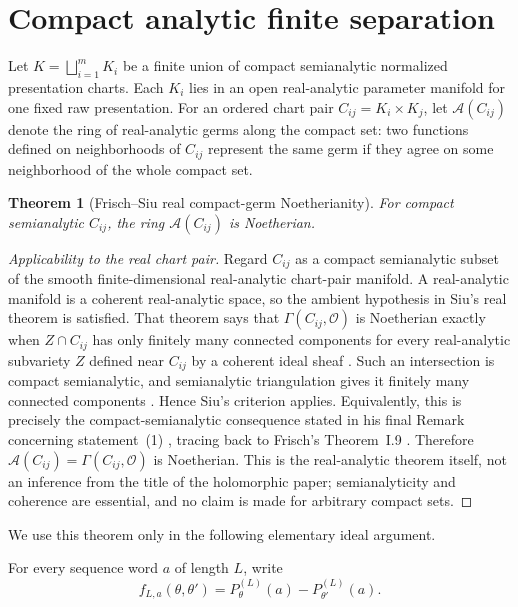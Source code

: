 \documentclass[11pt]{article}
\newtheorem{theorem}{Theorem}[section]
\newcommand{\cA}{\mathcal A}
\begin{document}
\section{Compact analytic finite separation}

Let $K=\bigsqcup_{i=1}^mK_i$ be a finite union of compact semianalytic normalized presentation charts.  Each $K_i$ lies in an open real-analytic parameter manifold for one fixed raw presentation.  For an ordered chart pair $C_{ij}=K_i\times K_j$, let $\cA(C_{ij})$ denote the ring of real-analytic germs along the compact set: two functions defined on neighborhoods of $C_{ij}$ represent the same germ if they agree on some neighborhood of the whole compact set.

\begin{theorem}[Frisch--Siu real compact-germ Noetherianity]
For compact semianalytic $C_{ij}$, the ring $\cA(C_{ij})$ is Noetherian.
\end{theorem}

\begin{proof}[Applicability to the real chart pair]
Regard $C_{ij}$ as a compact semianalytic subset of the smooth
finite-dimensional real-analytic chart-pair manifold.  A real-analytic
manifold is a coherent real-analytic space, so the ambient hypothesis in
Siu's real theorem is satisfied.  That theorem says that
$\Gamma(C_{ij},\mathcal O)$ is Noetherian exactly when
$Z\cap C_{ij}$ has only finitely many connected components for every
real-analytic subvariety $Z$ defined near $C_{ij}$ by a coherent ideal
sheaf \citep[Theorem~2]{Siu1969}.  Such an intersection is compact
semianalytic, and semianalytic triangulation gives it finitely many connected
components \citep{Lojasiewicz1964}.  Hence Siu's criterion applies.  Equivalently,
this is precisely the compact-semianalytic consequence stated in his
final Remark concerning statement~(1) \citep[final Remark]{Siu1969}, tracing back to Frisch's
Theorem~I.9 \citep[Theorem~I.9]{Frisch1967}.  Therefore
$\cA(C_{ij})=\Gamma(C_{ij},\mathcal O)$ is Noetherian.  This is the
real-analytic theorem itself, not an inference from the title of the
holomorphic paper; semianalyticity and coherence are essential, and no claim
is made for arbitrary compact sets.
\end{proof}

We use this theorem only in the following elementary ideal argument.

For every sequence word $a$ of length $L$, write
\[
f_{L,a}(\theta,\theta')=P_\theta^{(L)}(a)-P_{\theta'}^{(L)}(a).
\]
\end{document}
